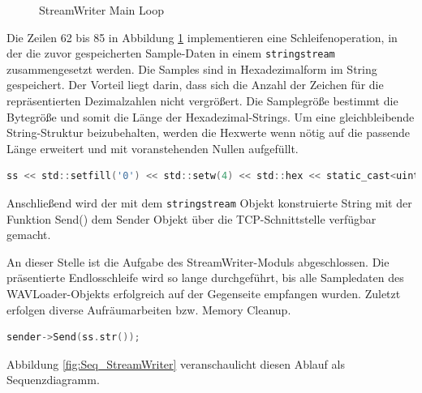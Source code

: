\begin{figure}[h!]
	
	\caption{StreamWriter Main Loop}
	\label{fig:WriterCPP}
\end{figure}
\clearpage
Die Zeilen 62 bis 85 in Abbildung \ref{fig:WriterCPP} implementieren eine Schleifenoperation, in der die zuvor gespeicherten Sample-Daten in einem \texttt{stringstream} zusammengesetzt werden. Die Samples sind in Hexadezimalform im String gespeichert. Der Vorteil liegt darin, dass sich die Anzahl der Zeichen für die repräsentierten Dezimalzahlen nicht vergrößert. Die Samplegröße bestimmt die Bytegröße und somit die Länge der Hexadezimal-Strings. Um eine gleichbleibende String-Struktur beizubehalten, werden die Hexwerte wenn nötig auf die passende Länge erweitert und mit voranstehenden Nullen aufgefüllt.

\begin{lstlisting}[language=C, frame=none]
	ss << std::setfill('0') << std::setw(4) << std::hex << static_cast<uint32_t>(sample);
\end{lstlisting} 

Anschließend wird der mit dem \texttt{stringstream} Objekt konstruierte String mit der Funktion Send() dem Sender Objekt über die TCP-Schnittstelle verfügbar gemacht.

An dieser Stelle ist die Aufgabe des StreamWriter-Moduls abgeschlossen. Die präsentierte Endlosschleife wird so lange durchgeführt, bis alle Sampledaten des WAVLoader-Objekts erfolgreich auf der Gegenseite empfangen wurden. Zuletzt erfolgen diverse Aufräumarbeiten bzw. Memory Cleanup.

\begin{lstlisting}[language=C, frame=none]
	sender->Send(ss.str());
\end{lstlisting}

Abbildung \ref{fig:Seq_StreamWriter} veranschaulicht diesen Ablauf als Sequenzdiagramm.

